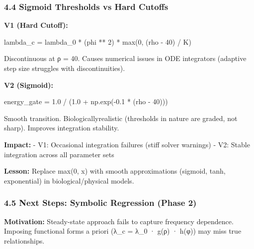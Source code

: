 \documentclass[
]{article}
\newenvironment{Shaded}{}{}
\newcommand{\BuiltInTok}[1]{\textcolor[rgb]{0.00,0.50,0.00}{#1}}
\newcommand{\DecValTok}[1]{\textcolor[rgb]{0.25,0.63,0.44}{#1}}
\newcommand{\FloatTok}[1]{\textcolor[rgb]{0.25,0.63,0.44}{#1}}
\newcommand{\NormalTok}[1]{#1}
\newcommand{\OperatorTok}[1]{\textcolor[rgb]{0.40,0.40,0.40}{#1}}
\begin{document}
\subsubsection{4.4 Sigmoid Thresholds vs Hard
Cutoffs}\label{sigmoid-thresholds-vs-hard-cutoffs}

\textbf{V1 (Hard Cutoff):}

\begin{Shaded}
\begin{Highlighting}[]
\NormalTok{lambda\_c }\OperatorTok{=}\NormalTok{ lambda\_0 }\OperatorTok{*}\NormalTok{ (phi }\OperatorTok{**} \DecValTok{2}\NormalTok{) }\OperatorTok{*} \BuiltInTok{max}\NormalTok{(}\DecValTok{0}\NormalTok{, (rho }\OperatorTok{{-}} \DecValTok{40}\NormalTok{) }\OperatorTok{/}\NormalTok{ K)}
\end{Highlighting}
\end{Shaded}

Discontinuous at ρ = 40. Causes numerical issues in ODE integrators
(adaptive step size struggles with discontinuities).

\textbf{V2 (Sigmoid):}

\begin{Shaded}
\begin{Highlighting}[]
\NormalTok{energy\_gate }\OperatorTok{=} \FloatTok{1.0} \OperatorTok{/}\NormalTok{ (}\FloatTok{1.0} \OperatorTok{+}\NormalTok{ np.exp(}\OperatorTok{{-}}\FloatTok{0.1} \OperatorTok{*}\NormalTok{ (rho }\OperatorTok{{-}} \DecValTok{40}\NormalTok{)))}
\end{Highlighting}
\end{Shaded}

Smooth transition. Biologicallyrealistic (thresholds in nature are
graded, not sharp). Improves integration stability.

\textbf{Impact:} - V1: Occasional integration failures (stiff solver
warnings) - V2: Stable integration across all parameter sets

\textbf{Lesson:} Replace max(0, x) with smooth approximations (sigmoid,
tanh, exponential) in biological/physical models.

\subsubsection{4.5 Next Steps: Symbolic Regression (Phase
2)}\label{next-steps-symbolic-regression-phase-2}

\textbf{Motivation:} Steady-state approach fails to capture frequency
dependence. Imposing functional forms a priori (λ\_c = λ\_0 · g(ρ) ·
h(φ)) may miss true relationships.
\end{document}
